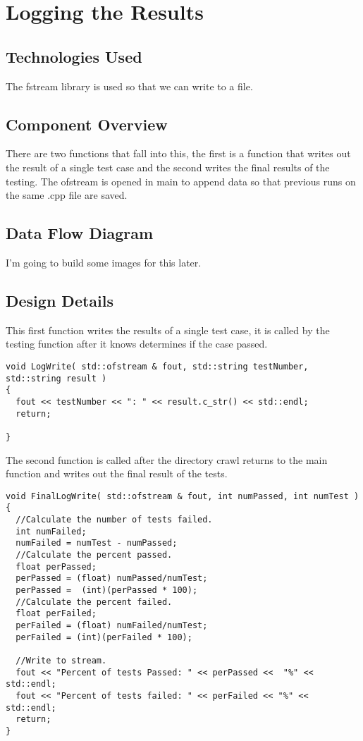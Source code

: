 \section{Logging the Results}

\subsection{Technologies Used}
The fstream library is used so that we can write to a file.

\subsection{Component Overview}
There are two functions that fall into this, the first is a function that writes out the result of a single test case and the second
writes the final results of the testing.  The ofstream is opened in main to append data so that previous runs on the same
.cpp file are saved.

\subsection{Data Flow Diagram}
I'm going to build some images for this later.

\subsection{Design Details}
This first function writes the results of a single test case, it is called by the testing function after it knows determines if the case
passed.
\begin{lstlisting}
void LogWrite( std::ofstream & fout, std::string testNumber, std::string result )
{
  fout << testNumber << ": " << result.c_str() << std::endl;
  return;
  
}
\end{lstlisting}
The second function is called after the directory crawl returns to the main function and writes out the final result of the tests.
\begin{lstlisting}
void FinalLogWrite( std::ofstream & fout, int numPassed, int numTest )
{
  //Calculate the number of tests failed.
  int numFailed;
  numFailed = numTest - numPassed;
  //Calculate the percent passed.
  float perPassed;
  perPassed = (float) numPassed/numTest;
  perPassed =  (int)(perPassed * 100);
  //Calculate the percent failed.
  float perFailed;
  perFailed = (float) numFailed/numTest;
  perFailed = (int)(perFailed * 100);
 
  //Write to stream.
  fout << "Percent of tests Passed: " << perPassed <<  "%" << std::endl;
  fout << "Percent of tests failed: " << perFailed << "%" << std::endl;
  return;
}
\end{lstlisting}


